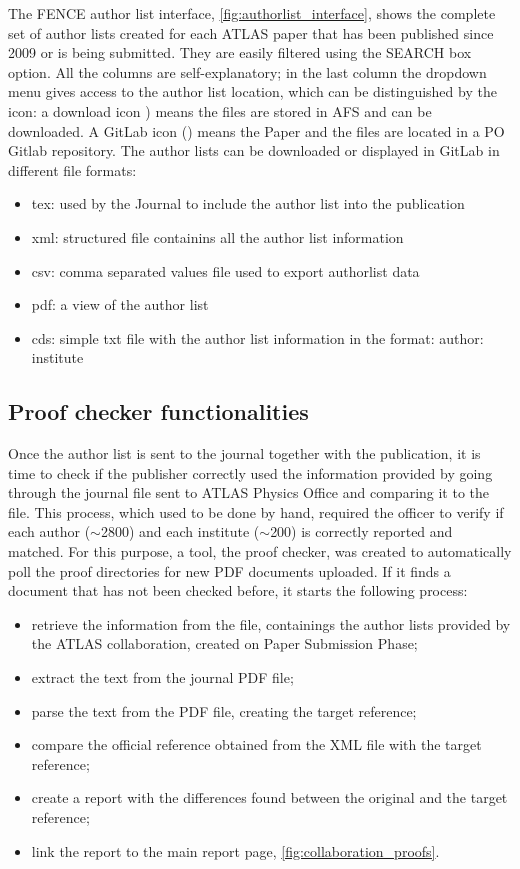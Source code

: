 The FENCE author list interface, \cref{fig:authorlist_interface}, shows the complete set of author lists created for each ATLAS paper that has been published since 2009 or is being submitted.
They are easily filtered using the SEARCH box option.
All the columns are self-explanatory; in the last column the dropdown menu gives access to the author list location, which can be distinguished by the icon:
a download icon {\faDownload}) means the files are stored in AFS and can be downloaded.
A GitLab icon (\faGitlab) means the Paper and the files are located in a PO Gitlab repository. The author lists can be downloaded or displayed in GitLab in different file formats:
\begin{itemize}
\item tex: used by the Journal to include the author list into the publication
\item xml: structured file containins all the author list information
\item csv: comma separated values file used to export authorlist data 
\item pdf: a view of the author list 
\item cds: simple txt file with the author list information in the format: author: institute
\end{itemize}

\subsection{Proof checker functionalities}
\label{sec:Proof_checker_functionalities}

Once the author list is sent to the journal together with the publication,
it is time to check if the publisher correctly used the information provided by going through the journal  file sent to ATLAS Physics Office and comparing it to the  file.
This process, which used to be done by hand, required the officer to verify if each author ($\sim$2800) and each institute ($\sim$200) is correctly reported and matched.
For this purpose, a tool, the proof checker, was created to automatically poll the proof directories for new PDF documents uploaded.
If it finds a document that has not been checked before, it starts the following process:

\begin{itemize}
\item retrieve the information from the  file, containings the author lists provided by the ATLAS collaboration,  created on Paper Submission Phase;
\item extract the text from the journal PDF file;
\item parse the text from the PDF file, creating the target reference;
\item compare the official reference obtained from the XML file with the target reference;
\item create a report with the differences found between the original and the target reference;
\item link the report to the main report page, \cref{fig:collaboration_proofs}.
\end{itemize}

